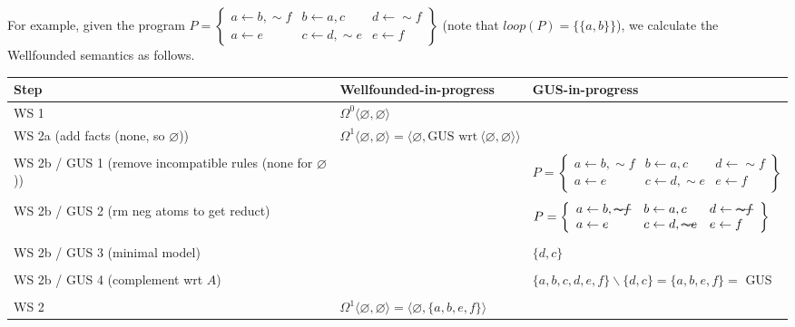 \documentclass[9pt,a4paper,landscape]{article}
\newcommand{\msout}[1]{\text{\sout{$#1$}}}
\begin{document}
{\pagebreak

For example, given the program $P = \left\{\begin{array}{lll}
a \leftarrow b, {\sim} f & b \leftarrow a, c & d \leftarrow {\sim} f\\
a \leftarrow e & c \leftarrow d, {\sim} e & e \leftarrow f
\end{array}\right\}$ (note that $loop(P) = \{ \{a, b \} \}$), we calculate the Wellfounded semantics as follows.

\begin{center}
	\begin{tabular}{p{5cm}p{7cm}p{7cm}}
		Step & Wellfounded-in-progress & GUS-in-progress\\ \midrule
		WS 1
		& $\Omega^0 \langle \varnothing, \varnothing \rangle$ &\\ \midrule
		WS 2a (add facts (none, so $\varnothing$))
		& $\Omega^1  \langle \varnothing, \varnothing \rangle = \langle \varnothing, \text{GUS wrt}\ \langle \varnothing, \varnothing \rangle \rangle$ &\\&\\
		WS 2b / GUS 1 (remove incompatible rules (none for $\varnothing$)) 
		&
		& $P = \left\{\begin{array}{lll}
		a \leftarrow b, {\sim} f & b \leftarrow a, c & d \leftarrow {\sim} f\\
		a \leftarrow e & c \leftarrow d, {\sim} e & e \leftarrow f
		\end{array}\right\}$ \\ &\\
		WS 2b / GUS 2 (rm neg atoms to get reduct) 
		& 
		& $P = \left\{\begin{array}{lll}
		a \leftarrow b, \msout{{\sim} f} & b \leftarrow a, c & d \leftarrow \msout{{\sim} f}\\
		a \leftarrow e & c \leftarrow d, \msout{{\sim} e} & e \leftarrow f
		\end{array}\right\}$  \\ &\\
		WS 2b / GUS 3 (minimal model) 
		& 
		& $\{ d, c \}$ \\ &\\
		WS 2b / GUS 4 (complement wrt $A$) 
		&
		&  $\{a, b, c, d, e, f\} \backslash \{d, c\} = \{a, b, e, f\} = $ GUS  \\&\\
		WS 2
		& $\Omega^1  \langle \varnothing, \varnothing \rangle = \langle \varnothing, \{a, b, e, f\} \rangle$ &\\ \midrule

\end{tabular}
\end{center}}
\end{document}
